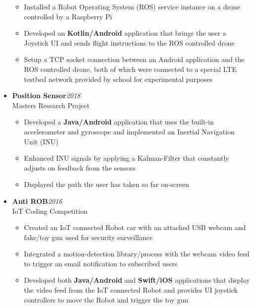 \begin{itemize}[leftmargin=0pt, label={}]
{    \vspace{-6pt}
    \begin{itemize}[label=\textbullet, leftmargin=*, noitemsep]
        \item{Installed a Robot Operating System (ROS) service instance on a drone controlled by a Raspberry Pi}
        \item{Developed an \textbf{Kotlin/Android} application that brings the user a Joystick UI and sends flight instructions to the ROS controlled drone}
        \item{Setup a TCP socket connection between an Android application and the ROS controlled drone, both of which were connected to a special LTE testbed network provided by school for experimental purposes}
    \end{itemize}
}

\item{
{\sectionheading\large{\textbf{Position Sensor}}}\hfill {\sectionheading\small{\textit{2018}}}\\
{\sectionheading\small{Masters Research Project}}\hfill

    \vspace{-6pt}
    \begin{itemize}[label=\textbullet, leftmargin=*, noitemsep]%
        \item{Developed a \textbf{Java/Android} application that uses the built-in accelerometer and gyroscope and implemented an Inertial Navigation Unit (INU)}
        \item{Enhanced INU signals by applying a Kalman-Filter that constantly adjusts on feedback from the sensors}
        \item{Displayed the path the user has taken so far on-screen}
    \end{itemize}
}

\item{
{\sectionheading\large{\textbf{Anti ROB}}}\hfill {\sectionheading\small{\textit{2016}}}\\
{\sectionheading\small{IoT Coding Competition}}\hfill

    \vspace{-6pt}
    \begin{itemize}[label=\textbullet, leftmargin=*, noitemsep]%
        \item{Created an IoT connected Robot car with an attached USB webcam and fake/toy gun used for security surveillance}
        \item{Integrated a motion-detection library/process with the webcam video feed to trigger an email notification to subscribed users}
        \item{Developed both \textbf{Java/Android} and \textbf{Swift/iOS} applications that display the video feed from the IoT connected Robot and provides UI joystick controllers to move the Robot and trigger the toy gun}
    \end{itemize}
}


\end{itemize}
